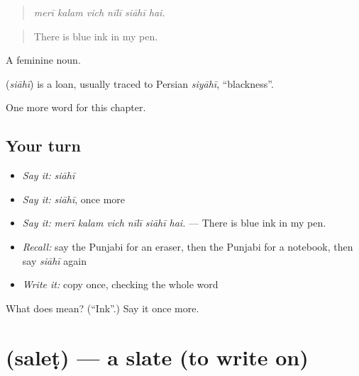 \begin{quote}
     
\end{quote}

\begin{quote}
\emph{merī kalam vich nīlī siāhī hai.}
\end{quote}

\begin{quote}
There is blue ink in my pen.
\end{quote}

A feminine noun.

\begin{cousinweb}
\textbf{} (\emph{siāhī}) is a loan, usually traced to Persian \emph{siyāhī}, \textquotedblleft{}blackness\textquotedblright{}.
\end{cousinweb}

\begin{grammarlens}[title={What you've built}]
One more word for this chapter.
\end{grammarlens}

\subsection*{Your turn}
\begin{itemize}
\raggedright
  \item \emph{Say it:} \emph{siāhī}
  \item \emph{Say it:} \emph{siāhī}, once more
  \item \emph{Say it:} \emph{merī kalam vich nīlī siāhī hai.} — There is blue ink in my pen.
  \item \emph{Recall:} say the Punjabi for an eraser, then the Punjabi for a notebook, then say \emph{siāhī} again
  \item \emph{Write it:} copy \textbf{} once, checking the whole word
\end{itemize}

\begin{tcolorbox}[breakable,colback=teal!4,colframe=teal!35!black,title={Before you move on}]
What does  mean? (\textquotedblleft{}Ink\textquotedblright{}.) Say it once more.
\end{tcolorbox}
\section[\texorpdfstring{\pa{ਸਲੇਟ} (saleṭ)}{ਸਲੇਟ (saleṭ)}]{ (saleṭ) — a slate (to write on)}

